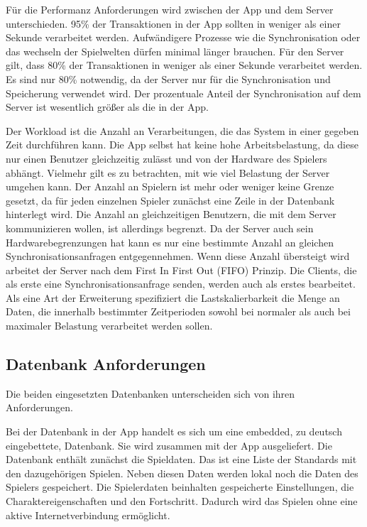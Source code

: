 		Für die Performanz Anforderungen wird zwischen der App und dem Server unterschieden. 95\% der Transaktionen in der App sollten in weniger als einer Sekunde verarbeitet werden. Aufwändigere Prozesse wie die Synchronisation oder das wechseln der Spielwelten dürfen minimal länger brauchen. Für den Server gilt, dass 80\% der Transaktionen in weniger als einer Sekunde verarbeitet werden. Es sind nur 80\% notwendig, da der Server nur für die Synchronisation und Speicherung verwendet wird. Der prozentuale Anteil der Synchronisation auf dem Server ist wesentlich größer als die in der App. 
		
		Der Workload ist die Anzahl an Verarbeitungen, die das System in einer gegeben Zeit durchführen kann. Die App selbst hat keine hohe Arbeitsbelastung, da diese nur einen Benutzer gleichzeitig zulässt und von der Hardware des Spielers abhängt. Vielmehr gilt es zu betrachten, mit wie viel Belastung der Server umgehen kann. Der Anzahl an Spielern ist mehr oder weniger keine Grenze gesetzt, da für jeden einzelnen Spieler zunächst eine Zeile in der Datenbank hinterlegt wird. Die Anzahl an gleichzeitigen Benutzern, die mit dem Server kommunizieren wollen, ist allerdings begrenzt. Da der Server auch sein Hardwarebegrenzungen hat kann es nur eine bestimmte Anzahl an gleichen Synchronisationsanfragen entgegennehmen. Wenn diese Anzahl übersteigt wird arbeitet der Server nach dem First In First Out (FIFO) Prinzip. Die Clients, die als erste eine Synchronisationsanfrage senden, werden auch als erstes bearbeitet. Als eine Art der Erweiterung spezifiziert die Lastskalierbarkeit die Menge an Daten, die innerhalb bestimmter Zeitperioden sowohl bei normaler als auch bei maximaler Belastung verarbeitet werden sollen.

	\subsection{Datenbank Anforderungen}
		Die beiden eingesetzten Datenbanken unterscheiden sich von ihren Anforderungen.
		
		Bei der Datenbank in der App handelt es sich um eine embedded, zu deutsch eingebettete, Datenbank. Sie wird zusammen mit der App ausgeliefert. Die Datenbank enthält zunächst die Spieldaten. Das ist eine Liste der Standards mit den dazugehörigen Spielen. Neben diesen Daten werden lokal noch die Daten des Spielers gespeichert. Die Spielerdaten beinhalten gespeicherte Einstellungen, die Charaktereigenschaften und den Fortschritt. Dadurch wird das Spielen ohne eine aktive Internetverbindung ermöglicht.
		
